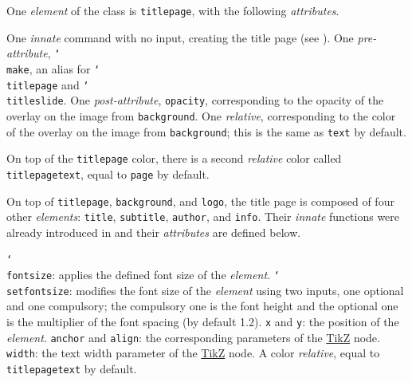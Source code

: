 \documentclass{slixte}
\newcommand{\codetext}[1]{\texttt{\color{second}#1}}
\newcommand{\cmdt}[1]{\char`\\#1}
\newcommand{\sptm}[1]{\textit{\color{third}#1}}
\newcommand{\tikzref}{\href{https://en.wikipedia.org/wiki/PGF/TikZ}{\color{first}TikZ}}
\begin{document}
\hypertarget{custom:titlepage}{}
\begin{slide}
    One \sptm{element} of the class is \codetext{titlepage}, with the following \sptm{attributes}.
    \begin{itemize}
        \fillitem One \sptm{innate} command with no input, creating the title page (see ).
        \fillitem One \sptm{pre-attribute}, \codetext{\cmdt{make}}, an alias for \codetext{\cmdt{titlepage}} and \codetext{\cmdt{titleslide}}.
        \fillitem One \sptm{post-attribute}, \codetext{opacity}, corresponding to the opacity of the overlay on the image from \codetext{background}.
        \fillitem One \sptm{relative}, corresponding to the color of the overlay on the image from \codetext{background}; this is the same as \codetext{text} by default.
        \begin{itemize}
            \emptyitem On top of the \codetext{titlepage} color, there is a second \sptm{relative} color called \codetext{titlepagetext}, equal to \codetext{page} by default.
        \end{itemize}
    \end{itemize}
\end{slide}

\begin{slide}
    On top of \codetext{titlepage}, \codetext{background}, and \codetext{logo}, the title page is composed of four other \sptm{elements}: \codetext{title}, \codetext{subtitle}, \codetext{author}, and \codetext{info}. Their \sptm{innate} functions were already introduced in  and their \sptm{attributes} are defined below.
    \begin{itemize}
        \fillitem \codetext{\cmdt{fontsize}}: applies the defined font size of the \sptm{element}.
        \fillitem \codetext{\cmdt{setfontsize}}: modifies the font size of the \sptm{element} using two inputs, one optional and one compulsory; the compulsory one is the font height and the optional one is the multiplier of the font spacing (by default 1.2).
        \fillitem \codetext{x} and \codetext{y}: the position of the \sptm{element}.
        \fillitem \codetext{anchor} and \codetext{align}: the corresponding parameters of the \tikzref{} node.
        \fillitem \codetext{width}: the text width parameter of the \tikzref{} node.
        \fillitem A color \sptm{relative}, equal to \codetext{titlepagetext} by default.
    \end{itemize}
\end{slide}
\end{document}
